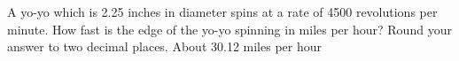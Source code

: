 {\label{spinningyoyo} A yo-yo which is 2.25 inches in diameter spins at a rate of 4500 revolutions per minute.  How fast is the edge of the yo-yo spinning in miles per hour?  Round your answer to two decimal places.}
{About 30.12 miles per hour}